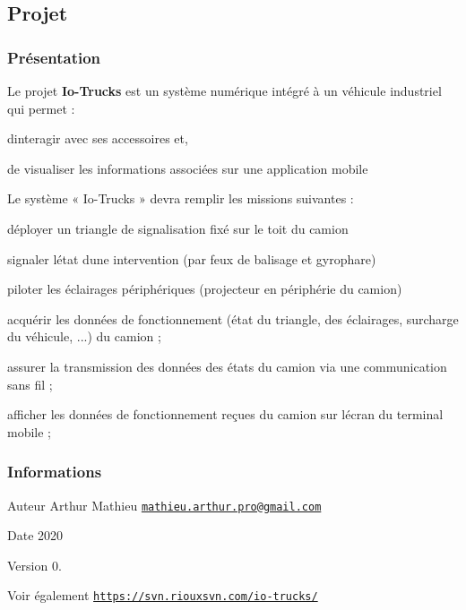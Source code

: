 \hypertarget{page__r_e_a_d_m_e_projet}{}\subsection{Projet}\label{page__r_e_a_d_m_e_projet}
\hypertarget{page__r_e_a_d_m_e_presentation}{}\subsubsection{Présentation}\label{page__r_e_a_d_m_e_presentation}
Le projet {\bfseries Io-\/\+Trucks} est un système numérique intégré à un véhicule industriel qui permet \+:


\begin{DoxyItemize}
\item d\textquotesingle{}interagir avec ses accessoires et,
\item de visualiser les informations associées sur une application mobile
\end{DoxyItemize}

Le système « Io-\/\+Trucks » devra remplir les missions suivantes \+:


\begin{DoxyItemize}
\item déployer un triangle de signalisation fixé sur le toit du camion
\item signaler l\textquotesingle{}état d\textquotesingle{}une intervention (par feux de balisage et gyrophare)
\item piloter les éclairages périphériques (projecteur en périphérie du camion)
\item acquérir les données de fonctionnement (état du triangle, des éclairages, surcharge du véhicule, ...) du camion ;
\item assurer la transmission des données des états du camion via une communication sans fil ;
\item afficher les données de fonctionnement reçues du camion sur l\textquotesingle{}écran du terminal mobile ;
\end{DoxyItemize}\hypertarget{page__r_e_a_d_m_e_informations}{}\subsubsection{Informations}\label{page__r_e_a_d_m_e_informations}
\begin{DoxyAuthor}{Auteur}
Arthur Mathieu \href{mailto:mathieu.arthur.pro@gmail.com}{\tt mathieu.\+arthur.\+pro@gmail.\+com} 
\end{DoxyAuthor}
\begin{DoxyDate}{Date}
2020 
\end{DoxyDate}
\begin{DoxyVersion}{Version}
0. 
\end{DoxyVersion}
\begin{DoxySeeAlso}{Voir également}
\href{https://svn.riouxsvn.com/io-trucks/}{\tt https\+://svn.\+riouxsvn.\+com/io-\/trucks/} 
\end{DoxySeeAlso}
